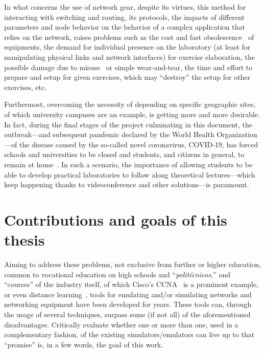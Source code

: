 In what concerns the use of network gear, despite its virtues, this method for interacting with switching and routing, its protocols, the impacts of different parameters and node behavior on the behavior of a complex application that relies on the network, raises problems such as the cost and fast obsolescence~\cite{automaticnetconfiggns} of equipments, the demand for individual presence on the laboratory (at least for manipulating physical links and network interfaces) for exercise elaboration, the possible damage due to misuse~\cite{teachinginovation} or simple wear-and-tear, the time and effort to prepare and setup for given exercises, which may ``destroy'' the setup for other exercises, etc. %

Furthermost, overcoming the necessity of depending on specific geographic sites, of which university campuses are an example, is getting more and more desirable.
In fact, during the final stages of the project culminating in this document, the outbreak---and subsequent pandemic declared by the World Health Organization---of the disease caused by the so-called novel coronavirus, COVID-19, has forced schools and universities to be closed and students, and citizens in general, to remain at home~\cite{covid19}.
In such a scenario, the importance of allowing students to be able to develop practical laboratories to follow along theoretical lectures---which keep happening thanks to videoconference and other solutions---is paramount.

\section{Contributions and goals of this thesis}

Aiming to address these problems, not exclusive from further or higher education, common to vocational education on high schools and ``\emph{politécnicos},'' and ``courses'' of the industry itself, of which Cisco's CCNA~\cite{ccna} is a prominent example, or even distance learning~\cite{networkvirtwithgns}, tools for emulating and/or simulating networks and networking equipment have been developed for years. %
These tools can, through the usage of several techniques, surpass some (if not all) of the aforementioned disadvantages.
Critically evaluate whether one or more than one, used in a complementary fashion, of the existing simulators/emulators can live up to that ``promise'' is, in a few words, the goal of this work.

